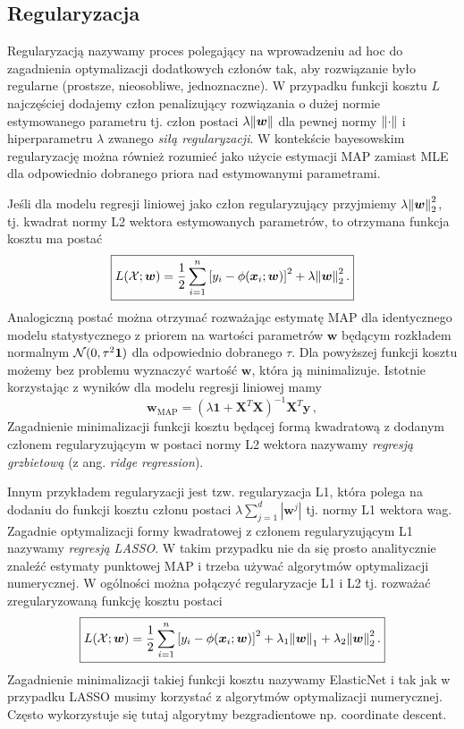 \documentclass{myclass}
\numberwithin{equation}{subsection}
\begin{document}
\subsection{Regularyzacja}

Regularyzacją  nazywamy proces polegający na wprowadzeniu ad hoc do zagadnienia optymalizacji
dodatkowych członów tak, aby rozwiązanie było regularne (prostsze, nieosobliwe, jednoznaczne). W
przypadku funkcji kosztu \(L\) najczęściej dodajemy człon penalizujący rozwiązania o dużej normie
estymowanego parametru tj. człon postaci \(\lambda \norm{\bm{w}}\) dla pewnej normy \(\norm{\cdot}\)
i hiperparametru \(\lambda\) zwanego \emph{siłą regularyzacji}. W kontekście bayesowskim
regularyzację można również rozumieć jako użycie estymacji MAP zamiast MLE dla odpowiednio dobranego
priora nad estymowanymi parametrami.

Jeśli dla modelu regresji liniowej jako człon regularyzujący przyjmiemy \(\lambda
\norm{\bm{w}}_2^2\), tj. kwadrat normy L2 wektora estymowanych parametrów, to otrzymana funkcja
kosztu ma postać
\[
\boxed{
L(\mathcal{X}; \bm{w}) = \frac{1}{2}\sum_{i=1}^n \left[y_i - \phi(\bm{x}_i; \bm{w})\right]^2 + \lambda \norm{\bm{w}}_2^2\,.
}
\]
Analogiczną postać można otrzymać rozważając estymatę MAP dla identycznego modelu statystycznego z
priorem na wartości parametrów \(\bm{w}\) będącym rozkładem normalnym \(\mathcal{N}(0, \tau^2\bm{1})\)
dla odpowiednio dobranego \(\tau\). Dla powyższej funkcji kosztu możemy bez problemu wyznaczyć
wartość \(\bm{w}\), która ją minimalizuje. Istotnie korzystając z wyników dla modelu regresji
liniowej mamy
\[
\bm{w}_\mathrm{MAP} = \left(\lambda \bm{1} + \bm{X}^T\bm{X}\right)^{-1}\bm{X}^T\bm{y}\,,
\]
Zagadnienie minimalizacji funkcji kosztu będącej formą kwadratową z dodanym członem regularyzującym
w postaci normy L2 wektora nazywamy \emph{regresją grzbietową} (z ang. \textit{ridge regression}).

Innym przykładem regularyzacji jest tzw. regularyzacja L1, która polega na dodaniu do funkcji kosztu
członu postaci \(\lambda \sum_{j=1}^d |\bm{w}^j|\) tj. normy L1 wektora wag. Zagadnie optymalizacji
formy kwadratowej z członem regularyzującym L1 nazywamy \emph{regresją LASSO}. W takim przypadku nie
da się prosto analitycznie znaleźć estymaty punktowej MAP i trzeba używać algorytmów optymalizacji
numerycznej. W ogólności można połączyć regularyzacje L1 i L2 tj. rozważać zregularyzowaną funkcję
kosztu postaci
\[
\boxed{
L(\mathcal{X};\bm{w}) = \frac{1}{2}\sum_{i=1}^n \left[y_i - \phi(\bm{x}_i;\bm{w})\right]^2 + \lambda_1\norm{\bm{w}}_1 +  \lambda_2\norm{\bm{w}}_2^2\,.
}
\]
Zagadnienie minimalizacji takiej funkcji kosztu nazywamy ElasticNet i tak jak w przypadku LASSO
musimy korzystać z algorytmów optymalizacji numerycznej. Często wykorzystuje się tutaj algorytmy
bezgradientowe np. coordinate descent.
\end{document}
